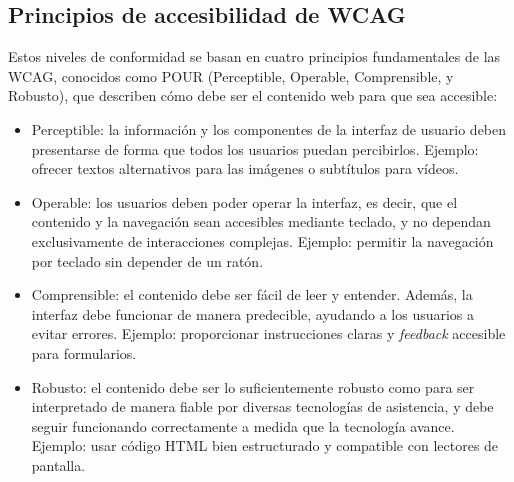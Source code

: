 \documentclass[]{article}
\begin{document}
\subsection*{Principios de accesibilidad de WCAG}
Estos niveles de conformidad se basan en cuatro principios fundamentales de las WCAG, conocidos como POUR (Perceptible, Operable, Comprensible, y Robusto), que describen cómo debe ser el contenido web para que sea accesible: 
\begin{itemize}
	\item Perceptible: la información y los componentes de la interfaz de usuario deben presentarse de forma que todos los usuarios puedan percibirlos. Ejemplo: ofrecer textos alternativos para las imágenes o subtítulos para vídeos.
	\item Operable: los usuarios deben poder operar la interfaz, es decir, que el contenido y la navegación sean accesibles mediante teclado, y no dependan exclusivamente de interacciones complejas. Ejemplo: permitir la navegación por teclado sin depender de un ratón.
	\item Comprensible: el contenido debe ser fácil de leer y entender. Además, la interfaz debe funcionar de manera predecible, ayudando a los usuarios a evitar errores. Ejemplo: proporcionar instrucciones claras y \textit{feedback} accesible para formularios.
	\item Robusto: el contenido debe ser lo suficientemente robusto como para ser interpretado de manera fiable por diversas tecnologías de asistencia, y debe seguir funcionando correctamente a medida que la tecnología avance. Ejemplo: usar código HTML bien estructurado y compatible con lectores de pantalla.
\end{itemize}
\end{document}
